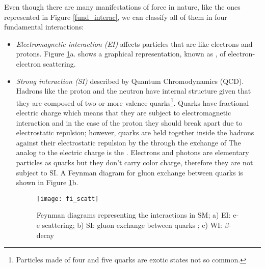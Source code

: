 Even though there are many manifestations of force in nature, like the ones represented in Figure \ref{fund_interac}, we can classify all of them in four fundamental interactions:
\begin{itemize}

\item \textit{Electromagnetic interaction (EI)} affects particles that are  like electrons and protons.
Figure \ref{fi_scatt}a. shows a graphical representation, known as , of electron-electron scattering.    

\item \textit{Strong interaction (SI)} described by Quantum Chromodynamics (QCD). Hadrons like the proton and the neutron have internal structure given that they are composed of two or more valence quarks\footnote{Particles made of four and five quarks are exotic states not so common.}. Quarks have fractional electric charge which means that they are subject to electromagnetic interaction and in the case of the proton they should break apart due to electrostatic repulsion; however, quarks are held together inside the hadrons against their electrostatic repulsion by the  through the exchange of  The analog to the electric charge is the . Electrons and photons are elementary particles as quarks but they don't carry color charge, therefore they are not subject to SI. A Feynman diagram for gluon exchange between quarks is shown in Figure \ref{fi_scatt}b.  

\begin{figure}[h!]
\centering
    \texttt{[image: fi\_scatt]}
\caption[SM interactions diagrams]{Feynman diagrams representing the interactions in SM; a) EI: e-e scattering; b) SI: gluon exchange between quarks ; c) WI: $\beta$-decay }
\label{fi_scatt}
\end{figure}


\end{itemize}
